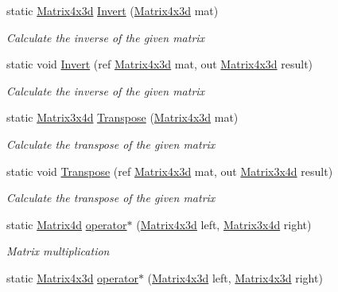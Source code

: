 \begin{DoxyCompactItemize}
static \hyperlink{struct_open_t_k_1_1_matrix4x3d}{Matrix4x3d} \hyperlink{struct_open_t_k_1_1_matrix4x3d_a0bbf40d645da0b1aaef8bce9ad1f88ce}{Invert} (\hyperlink{struct_open_t_k_1_1_matrix4x3d}{Matrix4x3d} mat)
\begin{DoxyCompactList}\small\item\em Calculate the inverse of the given matrix \end{DoxyCompactList}\item 
static void \hyperlink{struct_open_t_k_1_1_matrix4x3d_ae2a5c0ff2849ca00008748c7cf38b558}{Invert} (ref \hyperlink{struct_open_t_k_1_1_matrix4x3d}{Matrix4x3d} mat, out \hyperlink{struct_open_t_k_1_1_matrix4x3d}{Matrix4x3d} result)
\begin{DoxyCompactList}\small\item\em Calculate the inverse of the given matrix \end{DoxyCompactList}\item 
static \hyperlink{struct_open_t_k_1_1_matrix3x4d}{Matrix3x4d} \hyperlink{struct_open_t_k_1_1_matrix4x3d_aa5afafe1fdc4bdb10179d0ab6b0dd0b8}{Transpose} (\hyperlink{struct_open_t_k_1_1_matrix4x3d}{Matrix4x3d} mat)
\begin{DoxyCompactList}\small\item\em Calculate the transpose of the given matrix \end{DoxyCompactList}\item 
static void \hyperlink{struct_open_t_k_1_1_matrix4x3d_a4dc4ab6ac77f191dcbe95b66d416a09c}{Transpose} (ref \hyperlink{struct_open_t_k_1_1_matrix4x3d}{Matrix4x3d} mat, out \hyperlink{struct_open_t_k_1_1_matrix3x4d}{Matrix3x4d} result)
\begin{DoxyCompactList}\small\item\em Calculate the transpose of the given matrix \end{DoxyCompactList}\item 
static \hyperlink{struct_open_t_k_1_1_matrix4d}{Matrix4d} \hyperlink{struct_open_t_k_1_1_matrix4x3d_a25736562522ec1ba36087483c9b56fb9}{operator$\ast$} (\hyperlink{struct_open_t_k_1_1_matrix4x3d}{Matrix4x3d} left, \hyperlink{struct_open_t_k_1_1_matrix3x4d}{Matrix3x4d} right)
\begin{DoxyCompactList}\small\item\em Matrix multiplication \end{DoxyCompactList}\item 
static \hyperlink{struct_open_t_k_1_1_matrix4x3d}{Matrix4x3d} \hyperlink{struct_open_t_k_1_1_matrix4x3d_aeaf828992810afe60e5722108a6cbb59}{operator$\ast$} (\hyperlink{struct_open_t_k_1_1_matrix4x3d}{Matrix4x3d} left, \hyperlink{struct_open_t_k_1_1_matrix4x3d}{Matrix4x3d} right)

\end{DoxyCompactItemize}
